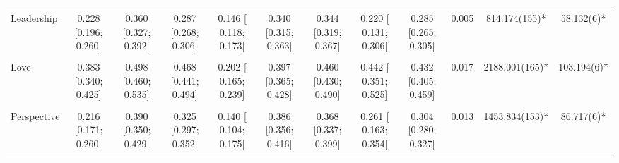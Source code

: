 \documentclass[
  letterpaper,
  DIV=11,
  numbers=noendperiod]{scrartcl}
\begin{document}
\begin{table}[H]
{\begin{tabular}[t]{lccccccccccc}
\cellcolor{gray!10}{Kindness} & \cellcolor{gray!10}{0.247 [0.202; 0.292]} & \cellcolor{gray!10}{0.330 [0.286; 0.372]} & \cellcolor{gray!10}{0.254 [0.225; 0.283]} & \cellcolor{gray!10}{0.114 [ 0.077; 0.149]} & \cellcolor{gray!10}{0.284 [0.251; 0.317]} & \cellcolor{gray!10}{0.316 [0.284; 0.347]} & \cellcolor{gray!10}{0.216 [ 0.114; 0.314]} & \cellcolor{gray!10}{0.259 [0.234; 0.284]} & \cellcolor{gray!10}{0.014} & \cellcolor{gray!10}{1095.738(160)*} & \cellcolor{gray!10}{45.059(6)*}\\
Leadership & 0.228 [0.196; 0.260] & 0.360 [0.327; 0.392] & 0.287 [0.268; 0.306] & 0.146 [ 0.118; 0.173] & 0.340 [0.315; 0.363] & 0.344 [0.319; 0.367] & 0.220 [ 0.131; 0.306] & 0.285 [0.265; 0.305] & 0.005 & 814.174(155)* & 58.132(6)*\\
\cellcolor{gray!10}{Love of learning} & \cellcolor{gray!10}{0.246 [0.200; 0.290]} & \cellcolor{gray!10}{0.350 [0.307; 0.391]} & \cellcolor{gray!10}{0.210 [0.179; 0.242]} & \cellcolor{gray!10}{0.161 [ 0.124; 0.197]} & \cellcolor{gray!10}{0.325 [0.291; 0.357]} & \cellcolor{gray!10}{0.260 [0.225; 0.295]} & \cellcolor{gray!10}{0.202 [ 0.100; 0.300]} & \cellcolor{gray!10}{0.242 [0.216; 0.267]} & \cellcolor{gray!10}{0.017} & \cellcolor{gray!10}{2181.254(158)*} & \cellcolor{gray!10}{40.356(6)*}\\
\addlinespace
Love & 0.383 [0.340; 0.425] & 0.498 [0.460; 0.535] & 0.468 [0.441; 0.494] & 0.202 [ 0.165; 0.239] & 0.397 [0.365; 0.428] & 0.460 [0.430; 0.490] & 0.442 [ 0.351; 0.525] & 0.432 [0.405; 0.459] & 0.017 & 2188.001(165)* & 103.194(6)*\\
\cellcolor{gray!10}{Perseverance} & \cellcolor{gray!10}{0.263 [0.221; 0.305]} & \cellcolor{gray!10}{0.410 [0.372; 0.447]} & \cellcolor{gray!10}{0.359 [0.332; 0.384]} & \cellcolor{gray!10}{0.186 [ 0.151; 0.219]} & \cellcolor{gray!10}{0.388 [0.359; 0.417]} & \cellcolor{gray!10}{0.407 [0.378; 0.436]} & \cellcolor{gray!10}{0.285 [ 0.191; 0.374]} & \cellcolor{gray!10}{0.348 [0.325; 0.370]} & \cellcolor{gray!10}{0.013} & \cellcolor{gray!10}{1930.815(154)*} & \cellcolor{gray!10}{74.661(6)*}\\
Perspective & 0.216 [0.171; 0.260] & 0.390 [0.350; 0.429] & 0.325 [0.297; 0.352] & 0.140 [ 0.104; 0.175] & 0.386 [0.356; 0.416] & 0.368 [0.337; 0.399] & 0.261 [ 0.163; 0.354] & 0.304 [0.280; 0.327] & 0.013 & 1453.834(153)* & 86.717(6)*\\
\cellcolor{gray!10}{Prudence} & \cellcolor{gray!10}{0.174 [0.126; 0.221]} & \cellcolor{gray!10}{0.201 [0.154; 0.248]} & \cellcolor{gray!10}{0.214 [0.183; 0.245]} & \cellcolor{gray!10}{0.128 [ 0.090; 0.165]} & \cellcolor{gray!10}{0.200 [0.164; 0.236]} & \cellcolor{gray!10}{0.224 [0.187; 0.259]} & \cellcolor{gray!10}{0.094 [-0.013; 0.198]} & \cellcolor{gray!10}{0.194 [0.167; 0.220]} & \cellcolor{gray!10}{0.015} & \cellcolor{gray!10}{1072.768(150)*} & \cellcolor{gray!10}{10.562(6)*}\\

\end{tabular}}
\end{table}
\end{document}
